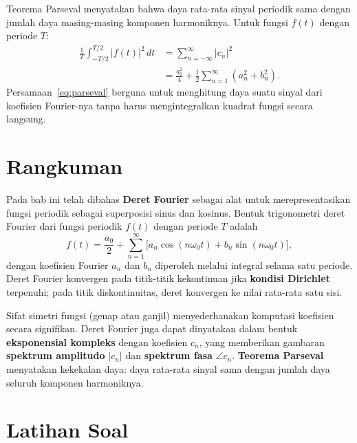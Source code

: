 Teorema Parseval menyatakan bahwa daya rata-rata sinyal periodik sama dengan jumlah daya masing-masing komponen harmoniknya. Untuk fungsi $f(t)$ dengan periode $T$:
\begin{equation}
\begin{split}
\frac{1}{T}\int_{-T/2}^{T/2}|f(t)|^2\,dt &= \sum_{n=-\infty}^{\infty}|c_n|^2 \\
&= \frac{a_0^2}{4}+\frac{1}{2}\sum_{n=1}^{\infty}(a_n^2+b_n^2).
\end{split}
\label{eq:parseval}
\end{equation}
Persamaan~\ref{eq:parseval} berguna untuk menghitung daya suatu sinyal dari koefisien Fourier-nya tanpa harus mengintegralkan kuadrat fungsi secara langsung.



\section*{Rangkuman}

Pada bab ini telah dibahas \textbf{Deret Fourier} sebagai alat untuk merepresentasikan fungsi periodik sebagai superposisi sinus dan kosinus. Bentuk trigonometri deret Fourier dari fungsi periodik $f(t)$ dengan periode $T$ adalah
\[
f(t) = \frac{a_0}{2} + \sum_{n=1}^{\infty}\bigl[a_n \cos(n\omega_0 t) + b_n \sin(n\omega_0 t)\bigr],
\]
dengan koefisien Fourier $a_n$ dan $b_n$ diperoleh melalui integral selama satu periode. Deret Fourier konvergen pada titik-titik kekontinuan jika \textbf{kondisi Dirichlet} terpenuhi; pada titik diskontinuitas, deret konvergen ke nilai rata-rata satu sisi.

Sifat simetri fungsi (genap atau ganjil) menyederhanakan komputasi koefisien secara signifikan. Deret Fourier juga dapat dinyatakan dalam bentuk \textbf{eksponensial kompleks} dengan koefisien $c_n$, yang memberikan gambaran \textbf{spektrum amplitudo} $|c_n|$ dan \textbf{spektrum fasa} $\angle c_n$. \textbf{Teorema Parseval} menyatakan kekekalan daya: daya rata-rata sinyal sama dengan jumlah daya seluruh komponen harmoniknya.

\section*{Latihan Soal}

